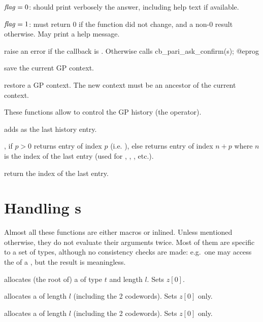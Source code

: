 \item $\hbox{\it f\kern0pt lag\/} = 0$: should print verbosely the answer, including help text if
available.

\item $\hbox{\it f\kern0pt lag\/} = 1$: must return $0$ if the function did not change, and a
non-$0$ result otherwise. May print a help message.


 raise an error if the
callback  is . Otherwise
calls
\bprog
  cb_pari_ask_confirm(s);
@eprog

 save the current GP
context.

 restore a GP context.
The new context must be an ancestor of the current context.


These functions allow to control the GP history (the \kbd{\%} operator).

 adds  as the last history entry.

, if $p>0$ returns entry of index $p$
(i.e. ), else returns entry of index $n+p$ where $n$ is the
index of the last entry (used for \kbd{\%}, , , etc.).

 return the index of the last entry.

\section{Handling s}
\noindent Almost all these functions are either macros or inlined. Unless
mentioned otherwise, they do not evaluate their arguments twice. Most of them
are specific to a set of types, although no consistency checks are made:
e.g.~one may access the  of a , but the result is
meaningless.


 allocates (the root of) a 
of type $t$ and length $l$. Sets $z[0]$.

 allocates a  of length $l$ (including the
2 codewords). Sets $z[0]$ only.

 allocates a  of length $l$ (including the
2 codewords). Sets $z[0]$ only.

